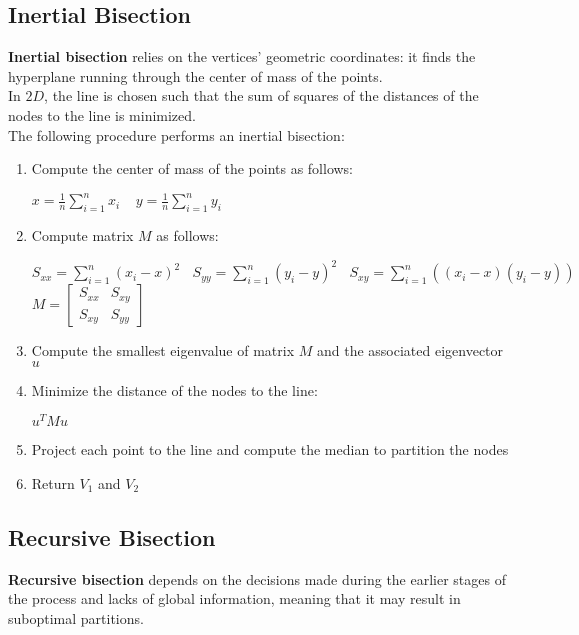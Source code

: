 \documentclass{article}
\begin{document}
\subsection{Inertial Bisection}
\textbf{Inertial bisection} relies on the vertices' geometric coordinates: it finds the hyperplane running through the center of mass of the points. \\
In $2D$, the line is chosen such that the sum of squares of the distances of the nodes to the line is minimized. \\
The following procedure performs an inertial bisection:
\begin{enumerate}
    \item Compute the center of mass of the points as follows:
        \begin{center}
            $x = \displaystyle\frac{1}{n} \displaystyle\sum_{i = 1}^n x_i \ \ \ \ \ y = \displaystyle\frac{1}{n}\displaystyle\sum_{i = 1}^n y_i$
        \end{center}
    \item Compute matrix $M$ as follows:
        \begin{center}
            $S_{xx} = \displaystyle\sum_{i = 1}^n(x_i - x)^2 \ \ \ \ S_{yy} = \displaystyle\sum_{i = 1}^n(y_i - y)^2 \ \ \ \ S_{xy} = \displaystyle\sum_{i = 1}^n((x_i - x)(y_i - y))$ \\
            \vspace{0.5cm}
            $ M = 
            \begin{bmatrix}
                S_{xx} & S_{xy} \\
                S_{xy} & S_{yy}
            \end{bmatrix}$
        \end{center}
    \item Compute the smallest eigenvalue of matrix $M$ and the associated eigenvector $u$ \item Minimize the distance of the nodes to the line:
        \begin{center}
            $u^TMu$
        \end{center}
    \item Project each point to the line and compute the median to partition the nodes
    \item Return $V_1$ and $V_2$
\end{enumerate}
\subsection{Recursive Bisection}
\textbf{Recursive bisection} depends on the decisions made during the earlier stages of the process and lacks of global information, meaning that it may result in suboptimal partitions.
\end{document}
